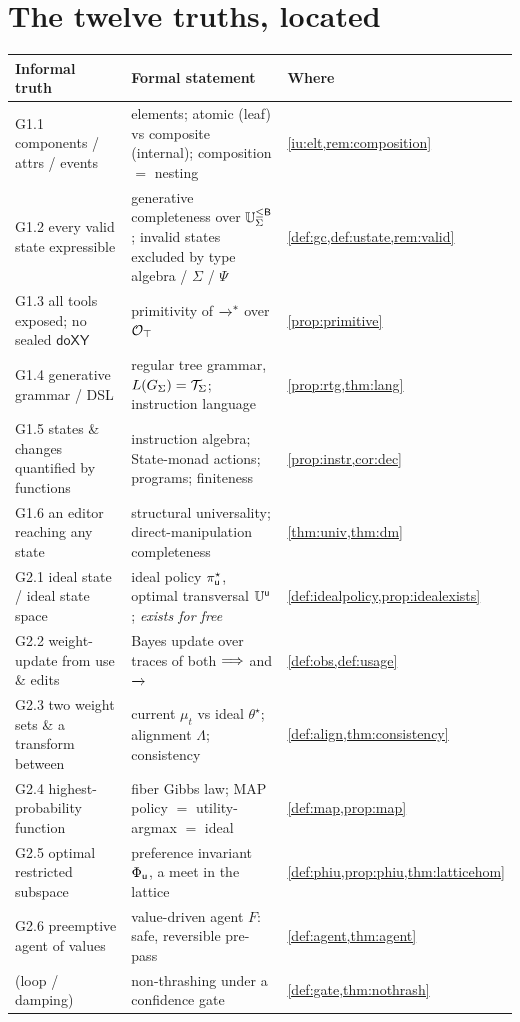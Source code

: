 \documentclass[../uxoxo-main]{subfiles}
\begin{document}
\section{The twelve truths, located}\label{iu:crosswalk}
\begin{center}
\footnotesize
\renewcommand{\arraystretch}{1.25}
\begin{tabularx}{\textwidth}{@{}l X l@{}}
\toprule
\textbf{Informal truth} & \textbf{Formal statement} & \textbf{Where}\\
\midrule
G1.1 components / attrs / events & elements; atomic (leaf) vs composite (internal); composition $=$ nesting & \cref{iu:elt,rem:composition}\\
G1.2 every valid state expressible & generative completeness over $\mathbb{U}_{\Sigma}^{\le \mathsf{B}}$; invalid states excluded by type algebra / $\Sigma$ / $\Psi$ & \cref{def:gc,def:ustate,rem:valid}\\
G1.3 all tools exposed; no sealed $\mathsf{doXY}$ & primitivity of $\xrightarrow{\,\,}^{*}$ over $\mathcal{O}_\top$ & \cref{prop:primitive}\\
G1.4 generative grammar / DSL & regular tree grammar, $L(G_\Sigma)=\mathcal{T}_\Sigma$; instruction language & \cref{prop:rtg,thm:lang}\\
G1.5 states \& changes quantified by functions & instruction algebra; State-monad actions; programs; finiteness & \cref{prop:instr,cor:dec}\\
G1.6 an editor reaching any state & structural universality; direct-manipulation completeness & \cref{thm:univ,thm:dm}\\
\midrule
G2.1 ideal state / ideal state space & ideal policy $\pi^\star_{\mathsf{u}}$, optimal transversal $\mathbb{U}^{\mathsf{u}}$; \emph{exists for free} & \cref{def:idealpolicy,prop:idealexists}\\
G2.2 weight-update from use \& edits & Bayes update over traces of both $\overset{}{\Longrightarrow}$ and $\xrightarrow{\,\,}$ & \cref{def:obs,def:usage}\\
G2.3 two weight sets \& a transform between & current $\mu_t$ vs ideal $\theta^\star$; alignment $\Lambda$; consistency & \cref{def:align,thm:consistency}\\
G2.4 highest-probability function & fiber Gibbs law; MAP policy $=$ utility-argmax $=$ ideal & \cref{def:map,prop:map}\\
G2.5 optimal restricted subspace & preference invariant $\Phi_{\mathsf{u}}$, a meet in the lattice & \cref{def:phiu,prop:phiu,thm:latticehom}\\
G2.6 preemptive agent of values & value-driven agent $F$: safe, reversible pre-pass & \cref{def:agent,thm:agent}\\
\midrule
(loop / damping) & non-thrashing under a confidence gate & \cref{def:gate,thm:nothrash}\\
\bottomrule
\end{tabularx}
\end{center}
\end{document}
